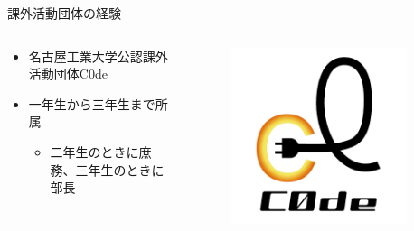 \documentclass[12pt, unicode]{beamer}
\begin{document}
\begin{frame}{課外活動団体の経験}
  \begin{columns}
    \begin{column}{0.8\textwidth}
      \begin{itemize}
        \item 名古屋工業大学公認課外活動団体C0de
        \item 一年生から三年生まで所属
        \begin{itemize}
          \item 二年生のときに庶務、三年生のときに部長
        \end{itemize}
      \end{itemize}
    \end{column}

    \begin{column}{0.2\textwidth}
      \begin{figure}[h]
        \centering
        \includegraphics[width=0.9\textwidth]{pictures/C0de.png}
      \end{figure}
    \end{column}
  \end{columns}


\end{frame}
\end{document}
